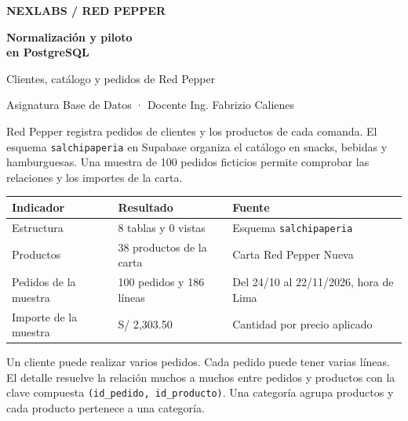 \documentclass[11pt,a4paper]{article}
\newcommand{\codigo}[1]{\texttt{#1}}
\newcommand{\seccion}[2]{\vspace{5pt}{\Large\bfseries #1\enspace #2}\par\vspace{2pt}}
\begin{document}
{\color{azul}\bfseries NEXLABS / RED PEPPER}\par
\vspace{6pt}
{\fontsize{34}{37}\selectfont\bfseries Normalización y piloto\\ en PostgreSQL}\par
\vspace{5pt}
{\large Clientes, catálogo y pedidos de Red Pepper}\par
\vspace{5pt}
{\color{gris} Asignatura Base de Datos · Docente Ing. Fabrizio Calienes}

\seccion{1.}{Alcance del modelo}
Red Pepper registra pedidos de clientes y los productos de cada comanda. El esquema \codigo{salchipaperia} en Supabase organiza el catálogo en snacks, bebidas y hamburguesas. Una muestra de 100 pedidos ficticios permite comprobar las relaciones y los importes de la carta.

\begin{tabularx}{\linewidth}{@{}lYY@{}}
\toprule
\textbf{Indicador} & \textbf{Resultado} & \textbf{Fuente}\\
\midrule
Estructura & 8 tablas y 0 vistas & Esquema \codigo{salchipaperia}\\
Productos & 38 productos de la carta & Carta Red Pepper Nueva\\
Pedidos de la muestra & 100 pedidos y 186 líneas & Del 24/10 al 22/11/2026, hora de Lima\\
Importe de la muestra & S/ 2,303.50 & Cantidad por precio aplicado\\
\bottomrule
\end{tabularx}

\seccion{2.}{Relaciones y claves}
Un cliente puede realizar varios pedidos. Cada pedido puede tener varias líneas. El detalle resuelve la relación muchos a muchos entre pedidos y productos con la clave compuesta \codigo{(id\_pedido, id\_producto)}. Una categoría agrupa productos y cada producto pertenece a una categoría.
\end{document}
